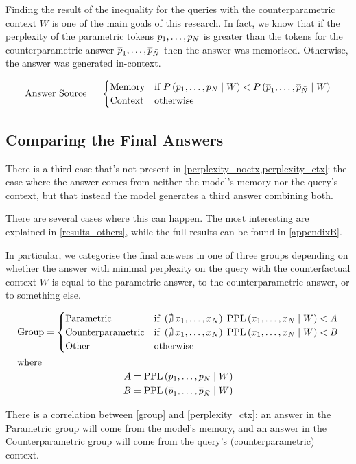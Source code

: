 Finding the result of the inequality for the queries with the counterparametric context $W$ is one of the main goals of this research.
In fact, we know that if the perplexity of the parametric tokens $p_1, \dots, p_N$ is greater than the tokens for the counterparametric answer $\overline{p}_1, \dots, \overline{p}_{\bar{N}}$ then the answer was memorised.
Otherwise, the answer was generated in-context.

\begin{equation}
	\text{Answer Source } =
	\begin{cases}
		\text{Memory} & \text{if } P \left( p_1, \dots, p_N \mid W \right) < P \left( \overline{p}_1, \dots, \overline{p}_{\bar{N}} \mid W \right) \\
		\text{Context} & \text{otherwise}
	\end{cases}
	\label{perplexity_ctx}
\end{equation}

\vfill{}

\subsection{Comparing the Final Answers}

There is a third case that's not present in \cref{perplexity_noctx,perplexity_ctx}: the case where the answer comes from neither the model's memory nor the query's context, but that instead the model generates a third answer combining both.

There are several cases where this can happen.
The most interesting are explained in \cref{results_others}, while the full results can be found in \cref{appendixB}.

In particular, we categorise the final answers in one of three groups depending on whether the answer with minimal perplexity on the query with the counterfactual context $W$ is equal to the parametric answer, to the counterparametric answer, or to something else.

\begin{gather}
	\text{Group} =
	\begin{cases}
		\text{Parametric} & \text{if } \left( \nexists \, x_1, \dots, x_N \right) \; \text{PPL} \left( x_1, \dots, x_N \mid W \right) < A \\
		\text{Counterparametric} & \text{if } \left( \nexists \, x_1, \dots, x_N \right) \; \text{PPL} \left( x_1, \dots, x_N \mid W \right) < B \\
		\text{Other} & \text{otherwise}
	\end{cases} \label{group} \\
	\intertext{where}
	\begin{aligned}
		A = \text{PPL} \left( p_1, \dots, p_N \mid W \right) \\
		B = \text{PPL} \left( \overline{p}_1, \dots, \overline{p}_{\bar{N}} \mid W \right)
	\end{aligned} \notag{}
\end{gather}

There is a correlation between \cref{group} and \cref{perplexity_ctx}: an answer in the Parametric group will come from the model's memory, and an answer in the Counterparametric group will come from the query's (counterparametric) context.
